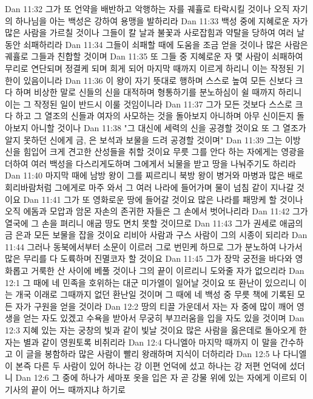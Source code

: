 Dan 11:32  그가 또 언약을 배반하고 악행하는 자를 궤휼로 타락시킬 것이나 오직 자기의 하나님을 아는 백성은 강하여 용맹을 발하리라
Dan 11:33  백성 중에 지혜로운 자가 많은 사람을 가르칠 것이나 그들이 칼 날과 불꽃과 사로잡힘과 약탈을 당하여 여러 날 동안 쇠패하리라
Dan 11:34  그들이 쇠패할 때에 도움을 조금 얻을 것이나 많은 사람은 궤휼로 그들과 친합할 것이며
Dan 11:35  또 그들 중 지혜로운 자 몇 사람이 쇠패하여 무리로 연단되며 정결케 되며 희게 되어 마지막 때까지 이르게 하리니 이는 작정된 기한이 있음이니라
Dan 11:36  이 왕이 자기 뜻대로 행하며 스스로 높여 모든 신보다 크다 하며 비상한 말로 신들의 신을 대적하며 형통하기를 분노하심이 쉴 때까지 하리니 이는 그 작정된 일이 반드시 이룰 것임이니라
Dan 11:37  그가 모든 것보다 스스로 크다 하고 그 열조의 신들과 여자의 사모하는 것을 돌아보지 아니하며 아무 신이든지 돌아보지 아니할 것이나
Dan 11:38  "그 대신에 세력의 신을 공경할 것이요 또 그 열조가 알지 못하던 신에게 금, 은 보석과 보물을 드려 공경할 것이며"
Dan 11:39  그는 이방 신을 힘입어 크게 견고한 산성들을 취할 것이요 무릇 그를 안다 하는 자에게는 영광을 더하여 여러 백성을 다스리게도하며 그에게서 뇌물을 받고 땅을 나눠주기도 하리라
Dan 11:40  마지막 때에 남방 왕이 그를 찌르리니 북방 왕이 병거와 마병과 많은 배로 회리바람처럼 그에게로 마주 와서 그 여러 나라에 들어가며 물이 넘침 같이 지나갈 것이요
Dan 11:41  그가 또 영화로운 땅에 들어갈 것이요 많은 나라를 패망케 할 것이나 오직 에돔과 모압과 암몬 자손의 존귀한 자들은 그 손에서 벗어나리라
Dan 11:42  그가 열국에 그 손을 펴리니 애굽 땅도 면치 못할 것이므로
Dan 11:43  그가 권세로 애굽의 금 은과 모든 보물을 잡을 것이요 리비아 사람과 구스 사람이 그의 시종이 되리라
Dan 11:44  그러나 동북에서부터 소문이 이르러 그로 번민케 하므로 그가 분노하여 나가서 많은 무리를 다 도륙하며 진멸코자 할 것이요
Dan 11:45  그가 장막 궁전을 바다와 영화롭고 거룩한 산 사이에 베풀 것이나 그의 끝이 이르리니 도와줄 자가 없으리라
Dan 12:1  그 때에 네 민족을 호위하는 대군 미가엘이 일어날 것이요 또 환난이 있으리니 이는 개국 이래로 그때까지 없던 환난일 것이며 그 때에 네 백성 중 무릇 책에 기록된 모든 자가 구원을 얻을 것이라
Dan 12:2  땅의 티끌 가운데서 자는 자 중에 많이 깨어 영생을 얻는 자도 있겠고 수욕을 받아서 무궁히 부끄러움을 입을 자도 있을 것이며
Dan 12:3  지혜 있는 자는 궁창의 빛과 같이 빛날 것이요 많은 사람을 옳은데로 돌아오게 한 자는 별과 같이 영원토록 비취리라
Dan 12:4  다니엘아 마지막 때까지 이 말을 간수하고 이 글을 봉함하라 많은 사람이 빨리 왕래하며 지식이 더하리라
Dan 12:5  나 다니엘이 본즉 다른 두 사람이 있어 하나는 강 이편 언덕에 섰고 하나는 강 저편 언덕에 섰더니
Dan 12:6  그 중에 하나가 세마포 옷을 입은 자 곧 강물 위에 있는 자에게 이르되 이 기사의 끝이 어느 때까지냐 하기로
